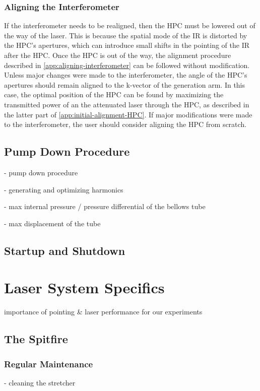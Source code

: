 \subsubsection{Aligning the Interferometer}
If the interferometer needs to be realigned, then the HPC must be lowered out of the way of the laser. This is because the spatial mode of the IR is distorted by the HPC's apertures, which can introduce small shifts in the pointing of the IR after the HPC. Once the HPC is out of the way, the alignment procedure described in \ref{app:aligning-interferometer} can be followed without modification. Unless major changes were made to the interferometer, the angle of the HPC's apertures should remain aligned to the k-vector of the generation arm. In this case, the optimal position of the HPC can be found by maximizing the transmitted power of an the attenuated laser through the HPC, as described in the latter part of \ref{app:initial-alignment-HPC}. If major modifications were made to the interferometer, the user should consider aligning the HPC from scratch.


\subsection{Pump Down Procedure}



- pump down procedure

- generating and optimizing harmonics

- max internal pressure / pressure differential of the bellows tube

- max displacement of the tube

\subsection{Startup and Shutdown}


\section{Laser System Specifics}
importance of pointing \& laser performance for our experiments

\subsection{The Spitfire}
\subsubsection{Regular Maintenance}
- cleaning the stretcher

